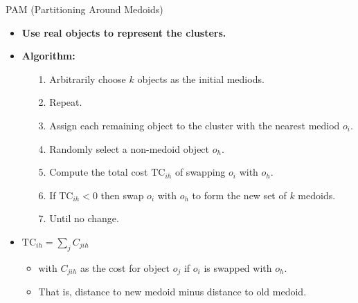 \documentclass[aspectratio=169,t,xcolor=dvipsnames]{beamer}
\begin{document}
  {
    \begin{frame}{PAM (Partitioning Around Medoids)}
      \begin{itemize}
        \item \textbf{Use real objects to represent the clusters.}
        \item \textbf{Algorithm:}
        \begin{itemize}
          \item[1.] Arbitrarily choose $k$ objects as the initial mediods.
          \item[2.] Repeat.
          \item[3.] \hspace{0.2cm} Assign each remaining object to the cluster with the nearest mediod $o_i$.
          \item[4.] \hspace{0.2cm} Randomly select a non-medoid object $o_h$.
          \item[5.] \hspace{0.2cm} Compute the total cost $\text{TC}_{ih}$ of swapping $o_i$ with $o_h$.
          \item[6.] \hspace{0.2cm} If $\text{TC}_{ih} < 0$ then swap $o_i$ with $o_h$ to form the new set of $k$ medoids.
          \item[7.] Until no change.
        \end{itemize}
        \item $\text{TC}_{ih} = \sum\limits_{j}C_{jih}$
        \begin{itemize}
          \item with $C_{jih}$ as the cost for object $o_j$ if $o_i$ is swapped with $o_h$.
          \item That is, distance to new medoid minus distance to old medoid.
        \end{itemize}
      \end{itemize}
    \end{frame}
  }
\end{document}
